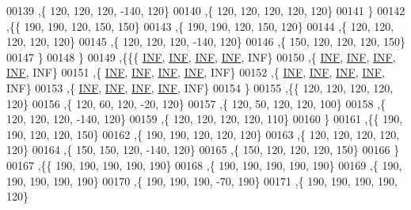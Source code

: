 \begin{DoxyCode}
00139   ,\{   120,   120,   120,  -140,   120\}
00140   ,\{   120,   120,   120,   120,   120\}
00141   \}
00142  ,\{\{   190,   190,   120,   150,   150\}
00143   ,\{   190,   190,   120,   150,   120\}
00144   ,\{   120,   120,   120,   120,   120\}
00145   ,\{   120,   120,   120,  -140,   120\}
00146   ,\{   150,   120,   120,   120,   150\}
00147   \}
00148  \}
00149 ,\{\{\{   \hyperlink{energy__const_8h_a12c2040f25d8e3a7b9e1c2024c618cb6}{INF},   \hyperlink{energy__const_8h_a12c2040f25d8e3a7b9e1c2024c618cb6}{INF},   \hyperlink{energy__const_8h_a12c2040f25d8e3a7b9e1c2024c618cb6}{INF},   \hyperlink{energy__const_8h_a12c2040f25d8e3a7b9e1c2024c618cb6}{INF},   INF\}
00150   ,\{   \hyperlink{energy__const_8h_a12c2040f25d8e3a7b9e1c2024c618cb6}{INF},   \hyperlink{energy__const_8h_a12c2040f25d8e3a7b9e1c2024c618cb6}{INF},   \hyperlink{energy__const_8h_a12c2040f25d8e3a7b9e1c2024c618cb6}{INF},   \hyperlink{energy__const_8h_a12c2040f25d8e3a7b9e1c2024c618cb6}{INF},   INF\}
00151   ,\{   \hyperlink{energy__const_8h_a12c2040f25d8e3a7b9e1c2024c618cb6}{INF},   \hyperlink{energy__const_8h_a12c2040f25d8e3a7b9e1c2024c618cb6}{INF},   \hyperlink{energy__const_8h_a12c2040f25d8e3a7b9e1c2024c618cb6}{INF},   \hyperlink{energy__const_8h_a12c2040f25d8e3a7b9e1c2024c618cb6}{INF},   INF\}
00152   ,\{   \hyperlink{energy__const_8h_a12c2040f25d8e3a7b9e1c2024c618cb6}{INF},   \hyperlink{energy__const_8h_a12c2040f25d8e3a7b9e1c2024c618cb6}{INF},   \hyperlink{energy__const_8h_a12c2040f25d8e3a7b9e1c2024c618cb6}{INF},   \hyperlink{energy__const_8h_a12c2040f25d8e3a7b9e1c2024c618cb6}{INF},   INF\}
00153   ,\{   \hyperlink{energy__const_8h_a12c2040f25d8e3a7b9e1c2024c618cb6}{INF},   \hyperlink{energy__const_8h_a12c2040f25d8e3a7b9e1c2024c618cb6}{INF},   \hyperlink{energy__const_8h_a12c2040f25d8e3a7b9e1c2024c618cb6}{INF},   \hyperlink{energy__const_8h_a12c2040f25d8e3a7b9e1c2024c618cb6}{INF},   INF\}
00154   \}
00155  ,\{\{   120,   120,   120,   120,   120\}
00156   ,\{   120,    60,   120,   -20,   120\}
00157   ,\{   120,    50,   120,   120,   100\}
00158   ,\{   120,   120,   120,  -140,   120\}
00159   ,\{   120,   120,   120,   120,   110\}
00160   \}
00161  ,\{\{   190,   190,   120,   120,   150\}
00162   ,\{   190,   190,   120,   120,   120\}
00163   ,\{   120,   120,   120,   120,   120\}
00164   ,\{   150,   150,   120,  -140,   120\}
00165   ,\{   150,   120,   120,   120,   150\}
00166   \}
00167  ,\{\{   190,   190,   190,   190,   190\}
00168   ,\{   190,   190,   190,   190,   190\}
00169   ,\{   190,   190,   190,   190,   190\}
00170   ,\{   190,   190,   190,   -70,   190\}
00171   ,\{   190,   190,   190,   190,   120\}

\end{DoxyCode}

